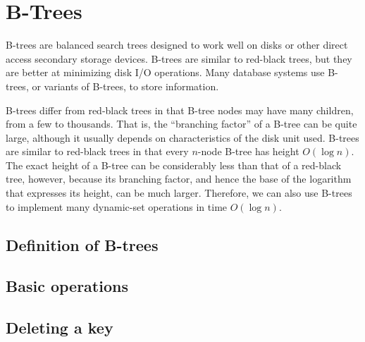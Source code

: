 \chapter{B-Trees}
\label{chap:btrees}

B-trees are balanced search trees designed to work well on disks or other direct access secondary storage devices. B-trees are similar to red-black trees, but they are better at minimizing disk I/O operations. Many database systems use B-trees, or variants of B-trees, to store information.

B-trees differ from red-black trees in that B-tree nodes may have many children,
from a few to thousands. That is, the ``branching factor'' of a B-tree can be quite
large, although it usually depends on characteristics of the disk unit used. B-trees
are similar to red-black trees in that every $n$-node B-tree has height $O\left(\log n\right)$. The
exact height of a B-tree can be considerably less than that of a red-black tree,
however, because its branching factor, and hence the base of the logarithm that
expresses its height, can be much larger. Therefore, we can also use B-trees to
implement many dynamic-set operations in time $O\left(\log n\right)$.

\section{Definition of B-trees}

\section{Basic operations}

\section{Deleting a key}